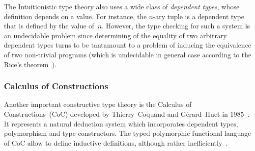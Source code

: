 \documentclass[article]{aaltoseries}
\begin{document}
The Intuitionistic type theory also uses a wide class of \textit{dependent types}, whose definition depends on a value. For instance, the $n$-ary tuple is a dependent type that is defined by the value of~$n$. However, the type checking for such a system is an undecidable problem since determining of the equality of two arbitrary dependent types turns to be tantamount to a problem of inducing the equivalence of two non-trivial programs (which is undecidable in general case according to the Rice's theorem~\cite{Rice53}).



\subsubsection{Calculus of Constructions}

Another important constructive type theory is the Calculus of Constructions~(CoC) developed by Thierry~Coquand and Gérard~Huet in 1985~\cite{Coq85}. It represents a natural deduction system which incorporates dependent types, polymorphism and type constructors. The typed polymorphic functional language of CoC allow to define inductive definitions, although rather inefficiently~\cite{Paulin15}.

\end{document}
